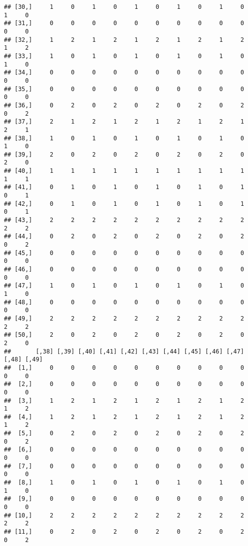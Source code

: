 \documentclass[
]{article}
\begin{document}
\begin{verbatim}
## [30,]     1     0     1     0     1     0     1     0     1     0     1     0
## [31,]     0     0     0     0     0     0     0     0     0     0     0     0
## [32,]     1     2     1     2     1     2     1     2     1     2     1     2
## [33,]     1     0     1     0     1     0     1     0     1     0     1     0
## [34,]     0     0     0     0     0     0     0     0     0     0     0     0
## [35,]     0     0     0     0     0     0     0     0     0     0     0     0
## [36,]     0     2     0     2     0     2     0     2     0     2     0     2
## [37,]     2     1     2     1     2     1     2     1     2     1     2     1
## [38,]     1     0     1     0     1     0     1     0     1     0     1     0
## [39,]     2     0     2     0     2     0     2     0     2     0     2     0
## [40,]     1     1     1     1     1     1     1     1     1     1     1     1
## [41,]     0     1     0     1     0     1     0     1     0     1     0     1
## [42,]     0     1     0     1     0     1     0     1     0     1     0     1
## [43,]     2     2     2     2     2     2     2     2     2     2     2     2
## [44,]     0     2     0     2     0     2     0     2     0     2     0     2
## [45,]     0     0     0     0     0     0     0     0     0     0     0     0
## [46,]     0     0     0     0     0     0     0     0     0     0     0     0
## [47,]     1     0     1     0     1     0     1     0     1     0     1     0
## [48,]     0     0     0     0     0     0     0     0     0     0     0     0
## [49,]     2     2     2     2     2     2     2     2     2     2     2     2
## [50,]     2     0     2     0     2     0     2     0     2     0     2     0
##       [,38] [,39] [,40] [,41] [,42] [,43] [,44] [,45] [,46] [,47] [,48] [,49]
##  [1,]     0     0     0     0     0     0     0     0     0     0     0     0
##  [2,]     0     0     0     0     0     0     0     0     0     0     0     0
##  [3,]     1     2     1     2     1     2     1     2     1     2     1     2
##  [4,]     1     2     1     2     1     2     1     2     1     2     1     2
##  [5,]     0     2     0     2     0     2     0     2     0     2     0     2
##  [6,]     0     0     0     0     0     0     0     0     0     0     0     0
##  [7,]     0     0     0     0     0     0     0     0     0     0     0     0
##  [8,]     1     0     1     0     1     0     1     0     1     0     1     0
##  [9,]     0     0     0     0     0     0     0     0     0     0     0     0
## [10,]     2     2     2     2     2     2     2     2     2     2     2     2
## [11,]     0     2     0     2     0     2     0     2     0     2     0     2

\end{verbatim}
\end{document}
